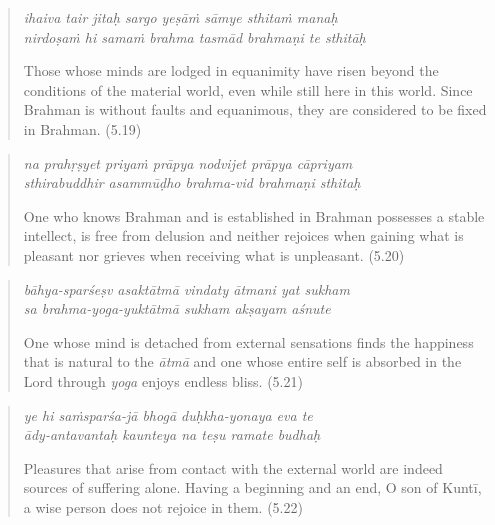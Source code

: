 \documentclass[12pt, twoside, openright]{memoir}
\begin{document}
\par
\begin{verse}
\textit{ihaiva tair jitaḥ sargo yeṣāṁ sāmye sthitaṁ manaḥ} \\
\textit{nirdoṣaṁ hi samaṁ brahma tasmād brahmaṇi te sthitāḥ}

\noindent Those whose minds are lodged in equanimity have risen beyond the conditions of the material world, even while still here in this world. Since Brahman is without faults and equanimous, they are considered to be fixed in Brahman. (5.19)
\end{verse}
\par



\par
\begin{verse}
\textit{na prahṛṣyet priyaṁ prāpya nodvijet prāpya cāpriyam} \\
\textit{sthirabuddhir asammūḍho brahma-vid brahmaṇi sthitaḥ}

\noindent One who knows Brahman and is established in Brahman possesses a stable intellect, is free from delusion and neither rejoices when gaining what is pleasant nor grieves when receiving what is unpleasant. (5.20)
\end{verse}
\par



\par
\begin{verse}
\textit{bāhya-sparśeṣv asaktātmā vindaty ātmani yat sukham} \\
\textit{sa brahma-yoga-yuktātmā sukham akṣayam aśnute}

\noindent One whose mind is detached from external sensations finds the happiness that is natural to the \textit{ātmā} and one whose entire self is absorbed in the Lord through \textit{yoga} enjoys endless bliss. (5.21)
\end{verse}
\par



\par
\begin{verse}
\textit{ye hi saṁsparśa-jā bhogā duḥkha-yonaya eva te} \\
\textit{ādy-antavantaḥ kaunteya na teṣu ramate budhaḥ}

\noindent Pleasures that arise from contact with the external world are indeed sources of suffering alone. Having a beginning and an end, O son of Kuntī, a wise person does not rejoice in them. (5.22)
\end{verse}
\par
\end{document}
